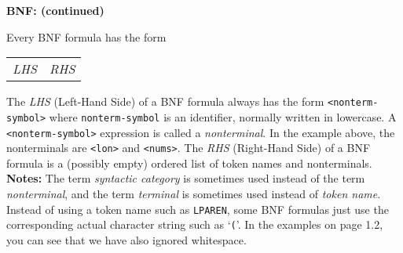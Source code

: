 \begin{minipage}[t]{\sw}
\slidenumber
\LARGE
{\bf BNF: (continued)}\exx
\emm{\Large\LightBox{\MYlon}}\exx

Every BNF formula has the form

\vspace{1ex}
\emm%
\begin{tabular}{@{}l@{\tt ~::=~}l}
{\em LHS} & {\em RHS} \\
\end{tabular}

\vspace{1ex}
The {\em LHS} (Left-Hand Side) of a BNF formula always has the form
\verb'<nonterm-symbol>' where \verb'nonterm-symbol' is an identifier,
normally written in lowercase.
A \verb'<nonterm-symbol>' expression is called a {\em nonterminal}.
In the example above,
the nonterminals are \verb'<lon>' and \verb'<nums>'.\exx
The {\em RHS} (Right-Hand Side) of a BNF formula
is a (possibly empty) ordered list
of token names and nonterminals.\exx
{\bf Notes:} The term {\em syntactic category} is sometimes used instead
of the term {\em nonterminal},
and the term {\em terminal} is sometimes used instead of {\em token name}.
Instead of using a token name such as \verb'LPAREN',
some BNF formulas just use
the corresponding actual character string such as `\verb'(''.
In the examples on page 1.2,
you can see that we have also ignored whitespace.
\end{minipage}
\clearpage
